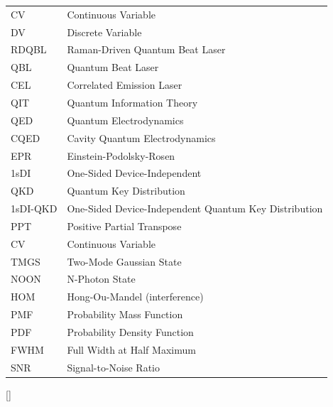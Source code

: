 \documentclass[12pt,a4paper]{report}
\renewcommand{\contentsname}{\textbf{TABLE OF CONTENTS\normalsize\centering}}
\begin{document}
\begin{tabular}{ll}
CV & Continuous Variable \\
DV & Discrete Variable \\
RDQBL & Raman-Driven Quantum Beat Laser \\
QBL & Quantum Beat Laser \\
CEL & Correlated Emission Laser \\
QIT & Quantum Information Theory \\
QED & Quantum Electrodynamics \\
CQED & Cavity Quantum Electrodynamics \\
EPR & Einstein-Podolsky-Rosen \\
1sDI & One-Sided Device-Independent \\
QKD & Quantum Key Distribution \\
1sDI-QKD & One-Sided Device-Independent Quantum Key Distribution \\
PPT & Positive Partial Transpose \\
CV & Continuous Variable \\
TMGS & Two-Mode Gaussian State \\
NOON & N-Photon State \\
HOM & Hong-Ou-Mandel (interference) \\
PMF & Probability Mass Function \\
PDF & Probability Density Function \\
FWHM & Full Width at Half Maximum \\
SNR & Signal-to-Noise Ratio \\
\end{tabular}

\newpage

\renewcommand{\contentsname}{\textbf{TABLE OF CONTENTS}}
\tableofcontents

\titleformat{\chapter}[display]{\large\bfseries\raggedright}{\chaptername~\thechapter}{1ex}{}[{\titlerule[1pt]}]

\newpage

\listoffigures

\newpage

\listoftables
\end{document}
